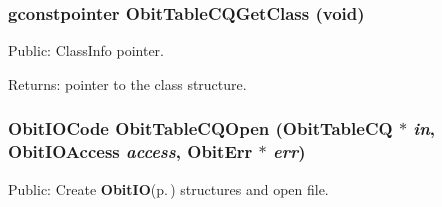 \subsubsection{\setlength{\rightskip}{0pt plus 5cm}gconstpointer Obit\-Table\-CQGet\-Class (void)}\label{ObitTableCQ_8h_a13}


Public: Class\-Info pointer. 

\begin{Desc}
\item[Returns:]pointer to the class structure. \end{Desc}
\subsubsection{\setlength{\rightskip}{0pt plus 5cm}Obit\-IOCode Obit\-Table\-CQOpen ({\bf Obit\-Table\-CQ} $\ast$ {\em in}, Obit\-IOAccess {\em access}, {\bf Obit\-Err} $\ast$ {\em err})}\label{ObitTableCQ_8h_a17}


Public: Create {\bf Obit\-IO}{\rm (p.\,\pageref{structObitIO})} structures and open file. 

